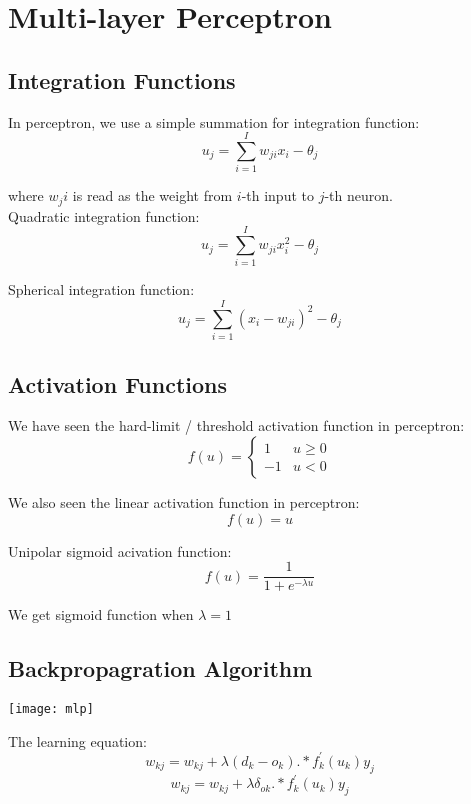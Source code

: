 \chapter{Multi-layer Perceptron}

\begin{multicols*}{2}

\section{Integration Functions}

\noindent In perceptron, we use a simple summation for integration function:
$$u_j = \sum_{i=1}^I w_{ji}x_i - \theta_j$$

\noindent where $w_ji$ is read as the weight from $i$-th input to $j$-th neuron. \\

\noindent Quadratic integration function:
$$u_j = \sum_{i=1}^I w_{ji}x_i^2 - \theta_j$$

\noindent Spherical integration function:
$$u_j = \sum_{i=1}^I ( x_i - w_{ji})^2 - \theta_j$$

\section{Activation Functions}

\noindent We have seen the hard-limit / threshold activation function in perceptron:
$$
f(u) = 
\begin{cases}
1 & u \ge 0\\
-1 & u < 0
\end{cases}
$$

\noindent We also seen the linear activation function in perceptron:
$$f(u) = u$$

\noindent Unipolar sigmoid acivation function:
$$f(u) = \frac{1}{1+e^{-\lambda u}}$$

\noindent We get sigmoid function when $\lambda=1$

\section{Backpropagration Algorithm}

\begin{center}
\texttt{[image: mlp]}
\end{center}

\noindent The learning equation:
$$w_{kj} = w_{kj} + \lambda (d_k - o_k) .* f_k^{'}(u_k) y_j$$
$$w_{kj} = w_{kj} + \lambda \delta_{ok} .* f_k^{'}(u_k) y_j$$


\end{multicols*}
